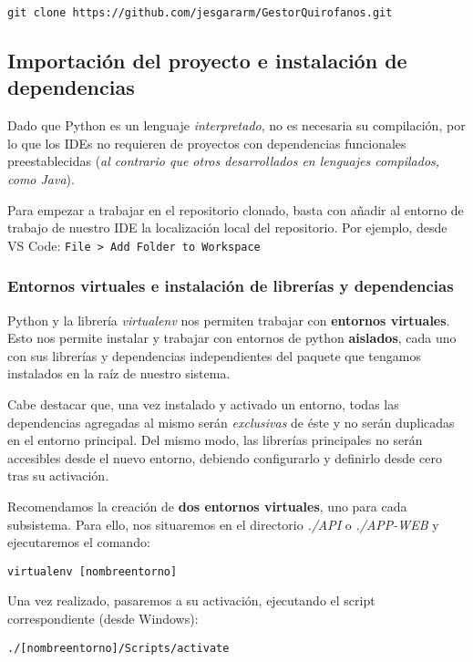\texttt{git clone https://github.com/jesgararm/GestorQuirofanos.git}

\subsection{Importación del proyecto e instalación de dependencias}

Dado que Python es un lenguaje \textit{interpretado}, no es necesaria su compilación, por lo que los IDEs no requieren de proyectos con dependencias funcionales preestablecidas (\textit{al contrario que otros desarrollados en lenguajes compilados, como Java}).

Para empezar a trabajar en el repositorio clonado, basta con añadir al entorno de trabajo de nuestro IDE la localización local del repositorio. Por ejemplo, desde VS Code:
\texttt{File > Add Folder to Workspace}


\subsubsection{Entornos virtuales e instalación de librerías y dependencias}

Python y la librería \textit{virtualenv} nos permiten trabajar con \textbf{entornos virtuales}. Esto nos permite instalar y trabajar con entornos de python \textbf{aislados}, cada uno con sus librerías y dependencias independientes del paquete que tengamos instalados en la raíz de nuestro sistema.

Cabe destacar que, una vez instalado y activado un entorno, todas las dependencias agregadas al mismo serán \textit{exclusivas} de éste y no serán duplicadas en el entorno principal. Del mismo modo, las librerías principales no serán accesibles desde el nuevo entorno, debiendo configurarlo y definirlo desde cero tras su activación.

Recomendamos la creación de \textbf{dos entornos virtuales}, uno para cada subsistema. Para ello, nos situaremos en el directorio \textit{./API} o \textit{./APP-WEB} y ejecutaremos el comando:

\texttt{virtualenv [nombreentorno]}

Una vez realizado, pasaremos a su activación, ejecutando el script correspondiente (desde Windows):

\texttt{./[nombreentorno]/Scripts/activate}


